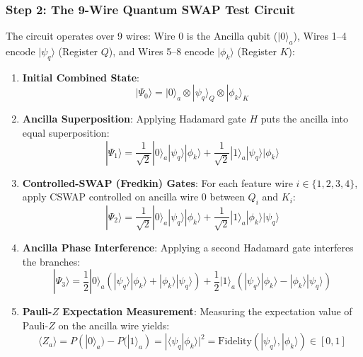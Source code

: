 \documentclass[11pt,a4paper]{article}
\begin{document}
\subsubsection{Step 2: The 9-Wire Quantum SWAP Test Circuit}
The circuit operates over 9 wires: Wire 0 is the Ancilla qubit ($|0\rangle_a$), Wires 1--4 encode $|\psi_q\rangle$ (Register $Q$), and Wires 5--8 encode $|\phi_k\rangle$ (Register $K$):
\begin{enumerate}
    \item \textbf{Initial Combined State}:
    \begin{equation}
    |\Psi_0\rangle = |0\rangle_a \otimes |\psi_q\rangle_Q \otimes |\phi_k\rangle_K
    \end{equation}
    \item \textbf{Ancilla Superposition}: Applying Hadamard gate $H$ puts the ancilla into equal superposition:
    \begin{equation}
    |\Psi_1\rangle = \frac{1}{\sqrt{2}} |0\rangle_a |\psi_q\rangle |\phi_k\rangle + \frac{1}{\sqrt{2}} |1\rangle_a |\psi_q\rangle |\phi_k\rangle
    \end{equation}
    \item \textbf{Controlled-SWAP (Fredkin) Gates}: For each feature wire $i \in \{1, 2, 3, 4\}$, apply CSWAP controlled on ancilla wire 0 between $Q_i$ and $K_i$:
    \begin{equation}
    |\Psi_2\rangle = \frac{1}{\sqrt{2}} |0\rangle_a |\psi_q\rangle |\phi_k\rangle + \frac{1}{\sqrt{2}} |1\rangle_a |\phi_k\rangle |\psi_q\rangle
    \end{equation}
    \item \textbf{Ancilla Phase Interference}: Applying a second Hadamard gate interferes the branches:
    \begin{equation}
    |\Psi_3\rangle = \frac{1}{2} |0\rangle_a \left( |\psi_q\rangle |\phi_k\rangle + |\phi_k\rangle |\psi_q\rangle \right) + \frac{1}{2} |1\rangle_a \left( |\psi_q\rangle |\phi_k\rangle - |\phi_k\rangle |\psi_q\rangle \right)
    \end{equation}
    \item \textbf{Pauli-$Z$ Expectation Measurement}: Measuring the expectation value of Pauli-$Z$ on the ancilla wire yields:
    \begin{equation}
    \langle Z_a \rangle = P(|0\rangle_a) - P(|1\rangle_a) = |\langle \psi_q | \phi_k \rangle|^2 = \text{Fidelity}(|\psi_q\rangle, |\phi_k\rangle) \in [0, 1]
    \end{equation}
\end{enumerate}
\end{document}
